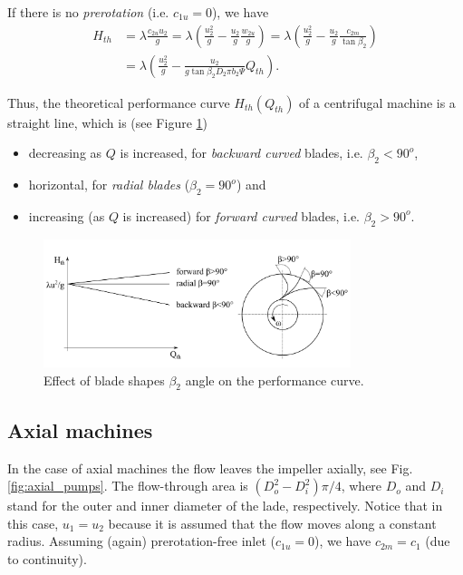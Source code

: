 If there is no \emph{prerotation} (i.e. $c_{1u}=0$), we have
%
\begin{align}
H_{th}&=\lambda \frac{c_{2u} u_2}{g}=\lambda\left(\frac{u_2^2}{g}-\frac{u_2}{g}\frac{w_{2u}}{g}\right)=\lambda\left(\frac{u_2^2}{g}-\frac{u_2}{g}\frac{c_{2m}}{\tan \beta_2}\right)\nonumber \\
&=\lambda\left(\frac{u_2^2}{g}-\frac{u_2}{g\tan \beta_2 D_2 \pi b_2 \Psi}Q_{th}\right).
\end{align}

Thus, the theoretical performance curve $H_{th}(Q_{th})$ of a centrifugal machine is a straight line, which is (see Figure \ref{fig:blade_shapes})
\begin{itemize}
\item decreasing as $Q$ is increased, for \emph{backward curved} blades, i.e. $\beta_2<90^o$,
\item horizontal, for \emph{radial blades} ($\beta_2=90^o$) and
\item increasing (as $Q$ is increased) for \emph{forward curved} blades, i.e. $\beta_2>90^o$.
\end{itemize}

\begin{figure}[ht]
\begin{center}
\includegraphics[width=0.8\textwidth]{figs/RadialPump_BladeShapes.png}
\caption{\label{fig:blade_shapes}Effect of blade shapes $\beta_2$ angle on the performance curve.}
\end{center}
\end{figure}



\subsection{Axial machines}

In the case of axial machines the flow leaves the impeller axially, see Fig. \ref{fig:axial_pumps}. The flow-through area is $\left(D_o^2-D_i^2\right)\pi/4$, where $D_o$ and $D_i$ stand for the outer and inner diameter of the lade, respectively. Notice that in this case, $u_1=u_2$ because it is assumed that the flow moves along a constant radius. Assuming (again) prerotation-free inlet ($c_{1u}=0$), we have $c_{2m}=c_1$ (due to continuity).

